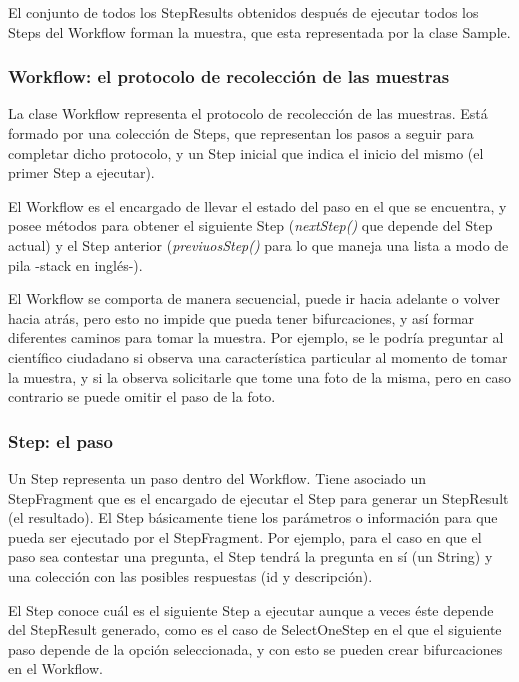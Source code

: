 El conjunto de todos los StepResults obtenidos después de ejecutar todos los Steps del Workflow forman la muestra, que esta representada por la clase Sample.


\subsubsection{Workflow: el protocolo de recolección de las muestras}
La clase Workflow representa el protocolo de recolección de las muestras. Está formado por una colección de Steps, que representan los pasos a seguir para completar dicho protocolo, y un Step inicial que indica el inicio del mismo (el primer Step a ejecutar).

El Workflow es el encargado de llevar el estado del paso en el que se encuentra, y posee métodos para obtener el siguiente Step (\textit{nextStep()}  que depende del Step actual) y el Step anterior (\textit{previuosStep()}  para lo que maneja una lista a modo de pila -stack en inglés-).

El Workflow se comporta de manera secuencial, puede ir hacia adelante o volver hacia atrás, pero esto no impide que pueda tener bifurcaciones, y así formar diferentes caminos para tomar la muestra. Por ejemplo, se le podría preguntar al científico ciudadano si observa una característica particular al momento de tomar la muestra, y si la observa solicitarle que tome una foto de la misma, pero en caso contrario se puede omitir el paso de la foto.

\subsubsection{Step: el paso}
Un Step representa un paso dentro del Workflow. Tiene asociado un StepFragment que es el encargado de ejecutar el Step para generar un StepResult (el resultado). El Step básicamente tiene los parámetros o información para que pueda ser ejecutado por el StepFragment.
Por ejemplo, para el caso en que el paso sea contestar una pregunta, el Step tendrá la pregunta en sí (un String) y una colección con las posibles respuestas (id y descripción).

El Step conoce cuál es el siguiente Step a ejecutar aunque a veces éste depende del StepResult generado, como es el caso de SelectOneStep en el que el siguiente paso depende de la opción seleccionada, y con esto se pueden crear bifurcaciones en el Workflow.

